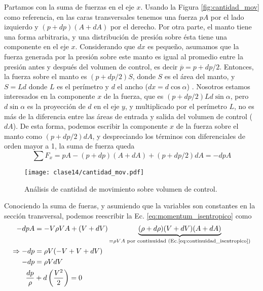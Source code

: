 Partamos con la suma de fuerzas en el eje $x$.
Usando la Figura \ref{fig:cantidad_mov} como referencia, en las caras transversales tenemos una fuerza $pA$ por el lado izquierdo y $(p+dp)(A+dA)$ por el derecho.
Por otra parte, el manto tiene una forma arbitraria, y una distribución de presión sobre ésta tiene una componente en el eje $x$.
Considerando que $dx$ es pequeño, asumamos que la fuerza generada por la presión sobre este manto es igual al promedio entre la presión antes y después del volumen de control, es decir $\overline{p} = p+dp/2$.
Entonces, la fuerza sobre el manto es $(p+dp/2)S$, donde $S$ es el área del manto, y $S=Ld$ donde $L$ es el perímetro y $d$ el ancho ($dx=d\cos\alpha$) .
Nosotros estamos interesados en la componente $x$ de la fuerza, que es $(p+dp/2)Ld\sin\alpha$, pero $d\sin\alpha$ es la proyección de $d$ en el eje $y$, y multiplicado por el perímetro $L$, no es más de la diferencia entre las áreas de entrada y salida del volumen de control ($dA$).
De esta forma, podemos escribir la componente $x$ de la fuerza sobre el manto como $(p+dp/2)dA$, y despreciando los términos con diferenciales de orden mayor a 1, la suma de fuerza queda
%
\begin{equation}
\sum F_x = pA - (p+dp)(A+dA) + (p+dp/2)dA = -dpA
\end{equation}
%
\begin{figure}
\centering
\texttt{[image: clase14/cantidad\_mov.pdf]}
\caption{Análisis de cantidad de movimiento sobre volumen de control.}
\label{fig:volumen_control}
\end{figure}

Conociendo la suma de fueras, y asumiendo que la variables son constantes en la sección transversal, podemos reescribir la Ec. \eqref{eq:momentum_isentropico} como
%
\begin{align}\label{eq:momentum_isen_final}
-dpA &= -V\rho VA + (V+dV)\underbrace{(\rho+d\rho)(V+dV)(A+dA)}_{=\rho VA\text{ por continuidad (Ec.\eqref{eq:continuidad_isentropico})}}\nonumber\\
\Rightarrow -dp &= \rho V(-V+V+dV)\nonumber\\
-dp &= \rho VdV\nonumber\\
\frac{dp}{\rho} &+ d\left(\frac{V^2}{2}\right) = 0
\end{align}

